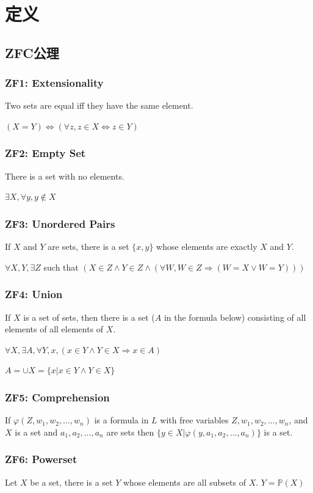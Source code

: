 \documentclass[12pt,a4paper]{ctexrep}
\begin{document}
\section{定义}
\subsection{ZFC公理}
\subsubsection{ZF1: Extensionality}
Two sets are equal iff they have the same element.

$(X=Y) \iff (\forall z, z\in X \iff z\in Y)$

\subsubsection{ZF2: Empty Set}
There is a set with no elements.

$\exists X, \forall y, y \notin X$

\subsubsection{ZF3: Unordered Pairs}
If $X$ and $Y$ are sets, there is a set $\{x,y\}$ whose elements are exactly $X$ and $Y$.

$\forall X,Y, \exists Z$ such that $(X \in Z \wedge Y \in Z \wedge(\forall W, W\in Z \Rightarrow (W = X \vee W = Y)))$
\subsubsection{ZF4: Union}
If $X$ is a set of sets, then there is a set ($A$ in the formula below) consisting of all elements of all elements of $X$.

$\forall X, \exists A, \forall Y,x, (x \in Y\wedge Y \in X \Rightarrow x \in A)$

$A = \cup X = \{x| x\in Y \wedge Y\in X\}$

\subsubsection{ZF5: Comprehension}
If $\varphi(Z,w_1,w_2,\dots,w_n)$ is a formula in $L$ with free variables $Z,w_1,w_2,\dots,w_n$, and $X$ is a set and $a_1,a_2,\dots,a_n$ are sets then $\{y\in X| \varphi(y,a_1,a_2,\dots,a_n)\}$ is a set. 

\subsubsection{ZF6: Powerset}
Let $X$ be a set, there is a set $Y$ whose elements are all subsets of $X$. $Y = \mathbb{P}(X)$
\end{document}
